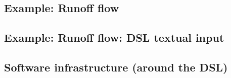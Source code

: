 \documentclass[]{article}
\begin{document}

\subsection{Example: Runoff flow}\label{example-runoff-flow}


\subsection{Example: Runoff flow: DSL textual
input}\label{example-runoff-flow-dsl-textual-input}


\subsection{Software infrastructure (around the
DSL)}\label{software-infrastructure-around-the-dsl}
\end{document}
